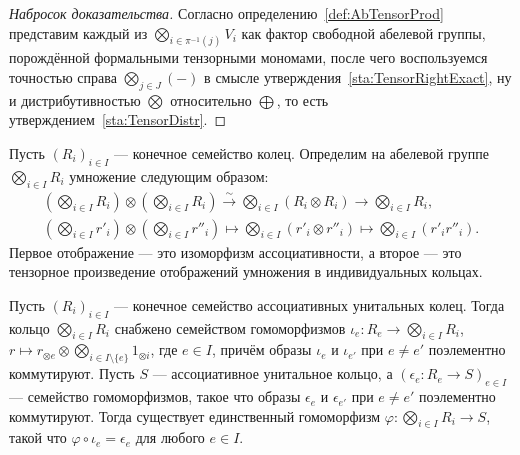 \documentclass[
	extrafontsizes,
	11pt,
	hyphens,
]{memoir}
\begin{document}
\begin{proof}[Набросок доказательства]
Согласно определению~\ref{def:AbTensorProd} представим каждый из \(\bigotimes_{i \in \pi^{-1}(j)} V_i\) как фактор свободной абелевой группы, порождённой формальными тензорными мономами, после чего воспользуемся точностью справа \(\bigotimes_{j \in J}(-)\) в смысле утверждения~\ref{sta:TensorRightExact}, ну и дистрибутивностью \(\bigotimes\) относительно \(\bigoplus\), то есть утверждением~\ref{sta:TensorDistr}.
\end{proof}


\begin{definition}
Пусть \((R_i)_{i \in I}\) --- конечное семейство колец.
Определим на абелевой группе \(\bigotimes_{i \in I} R_i\) умножение следующим образом:
\begin{gather*}
\textstyle
(\bigotimes_{i \in I} R_i)
\otimes
(\bigotimes_{i \in I} R_i)
\xrightarrow{\sim}
\bigotimes_{i \in I} (R_i \otimes R_i)
\to
\bigotimes_{i \in I} R_i,
\\
\textstyle
(\bigotimes_{i \in I} r'_i)
\otimes
(\bigotimes_{i \in I} r''_i)
\mapsto
\bigotimes_{i \in I} (r'_i \otimes r''_i)
\mapsto
\bigotimes_{i \in I} (r'_i r''_i).
\end{gather*}
Первое отображение --- это изоморфизм ассоциативности, а второе --- это тензорное произведение отображений умножения в индивидуальных кольцах.
\end{definition}

\begin{statement}
Пусть \((R_i)_{i \in I}\) --- конечное семейство ассоциативных унитальных колец.
Тогда кольцо \(\bigotimes_{i \in I} R_i\) снабжено семейством гомоморфизмов
\(\iota_e : R_e \to \bigotimes_{i \in I} R_i\),
\(r \mapsto r_{\otimes e} \otimes \bigotimes_{i \in I \setminus \{e\}} 1_{\otimes i}\), где \(e \in I\),
причём образы \(\iota_e\) и \(\iota_{e'}\) при \(e \neq e'\) поэлементно коммутируют.
Пусть \(S\) --- ассоциативное унитальное кольцо, а \((\epsilon_e : R_e \to S)_{e \in I}\) --- семейство гомоморфизмов, такое что образы \(\epsilon_e\) и \(\epsilon_{e'}\) при \(e \neq e'\) поэлементно коммутируют.
Тогда существует единственный гомоморфизм \(\varphi : \bigotimes_{i \in I} R_i \to S\), такой что \(\varphi \circ \iota_e = \epsilon_e\) для любого \(e \in I\).
\end{statement}
\end{document}
